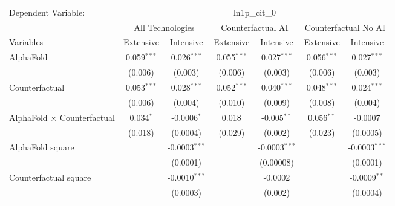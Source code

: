 \begingroup
\centering
\begin{tabular}{lcccccc}
   \tabularnewline \midrule \midrule
   Dependent Variable: & \multicolumn{6}{c}{ln1p\_cit\_0}\\
 & \multicolumn{2}{c}{All Technologies} & \multicolumn{2}{c}{Counterfactual AI} & \multicolumn{2}{c}{Counterfactual No AI} \\
\cmidrule(lr){1-1}\cmidrule(lr){2-3} \cmidrule(lr){4-5} \cmidrule(lr){6-7}
Variables & \multicolumn{1}{c}{Extensive} & \multicolumn{1}{c}{Intensive} & \multicolumn{1}{c}{Extensive} & \multicolumn{1}{c}{Intensive} & \multicolumn{1}{c}{Extensive} & \multicolumn{1}{c}{Intensive} \\
\cmidrule(lr){1-1}\cmidrule(lr){2-2} \cmidrule(lr){3-3} \cmidrule(lr){4-4} \cmidrule(lr){5-5} \cmidrule(lr){6-6} \cmidrule(lr){7-7}
   AlphaFold                          & 0.059$^{***}$ & 0.026$^{***}$     & 0.055$^{***}$ & 0.027$^{***}$   & 0.056$^{***}$ & 0.027$^{***}$\\   
                                      & (0.006)       & (0.003)           & (0.006)       & (0.003)         & (0.006)       & (0.003)\\   
   Counterfactual                     & 0.053$^{***}$ & 0.028$^{***}$     & 0.052$^{***}$ & 0.040$^{***}$   & 0.048$^{***}$ & 0.024$^{***}$\\   
                                      & (0.006)       & (0.004)           & (0.010)       & (0.009)         & (0.008)       & (0.004)\\   
   AlphaFold $\times$ Counterfactual  & 0.034$^{*}$   & -0.0006$^{*}$     & 0.018         & -0.005$^{**}$   & 0.056$^{**}$  & -0.0007\\   
                                      & (0.018)       & (0.0004)          & (0.029)       & (0.002)         & (0.023)       & (0.0005)\\   
   AlphaFold square                   &               & -0.0003$^{***}$   &               & -0.0003$^{***}$ &               & -0.0003$^{***}$\\   
                                      &               & (0.0001)          &               & (0.00008)       &               & (0.0001)\\   
   Counterfactual square              &               & -0.0010$^{***}$   &               & -0.0002         &               & -0.0009$^{**}$\\   
                                      &               & (0.0003)          &               & (0.002)         &               & (0.0004)\\   

\end{tabular}
